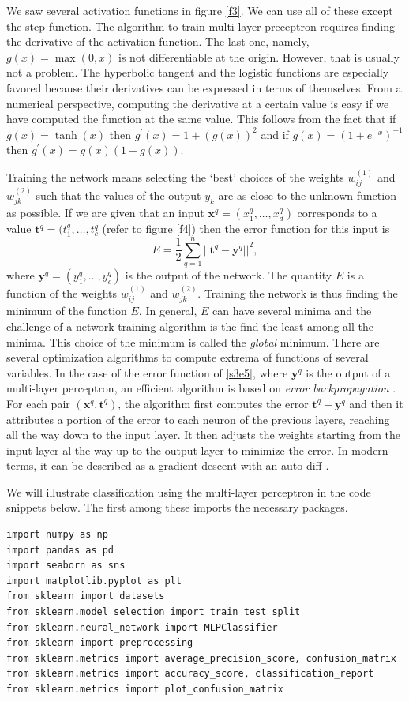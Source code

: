 \documentclass[11pt]{article}
\numberwithin{equation}{section}
\renewcommand{\vec}{\mathbf}
\begin{document}
We saw several activation functions in figure \ref{f3}. We can use all of
these except the step function. The algorithm to train multi-layer preceptron 
requires finding the 
derivative of the activation function. The last one, namely, $g(x)=\max(0, x)$ 
is not differentiable at the origin. However, that is usually not a problem. 
The hyperbolic tangent and the logistic functions are especially favored because
their derivatives can be expressed in terms of themselves. From a numerical
perspective, computing the derivative at a certain value is easy if we have
computed the function at the same value. This follows from the fact that if
$g(x) = \tanh(x)$ then $g^\prime(x) = 1 + (g(x))^2$ and if $g(x) =
(1+e^{-x})^{-1}$ then $g^\prime(x) = g(x)(1 - g(x))$.

Training the network means selecting the `best' choices of the weights 
$w^{(1)}_{ij}$ and $w^{(2)}_{jk}$ such that the values of the output $y_k$ 
are as close to the unknown function as possible. If we are given that an
input $\vec{x}^q = (x_1^q, \ldots, x_d^q)$ corresponds to a value $\vec{t}^q
= (t_1^q, \ldots, t_c^q$ (refer to figure \ref{f4}) then the error function
for this input is
\begin{equation}\label{s3e5}
E = \frac{1}{2}\sum_{q=1}^n ||\vec{t}^q - \vec{y}^q||^2,
\end{equation}
where $\vec{y}^q = (y_1^q, \ldots, y_c^q)$ is the output of the network. The
quantity $E$ is a function of the weights $w^{(1)}_{ij}$ and $w^{(2)}_{jk}$.
Training the network is thus finding the minimum of the function $E$. In 
general, $E$ can have several minima and the challenge of a network training
algorithm is the find the least among all the minima. This choice of the
minimum is called the \emph{global} minimum. There are several optimization
algorithms to compute extrema of functions of several variables. In the case
of the error function of \eqref{s3e5}, where $\vec{y}^q$ is the output of a
multi-layer perceptron, an efficient algorithm is based on \emph{error
backpropagation} \cite{rumelhart1985learning}. For each pair $(\vec{x}^q, 
\vec{t}^q)$, the algorithm first computes the error $\vec{t}^q - \vec{y}^q$
and then it attributes a portion of the error to each neuron of the previous
layers, reaching all the way down to the input layer. It then adjusts the 
weights starting from the input layer al the way up to the output layer to 
minimize the error. In modern terms, it can be described as a gradient descent 
with an auto-diff \cite{geron2019hands}.

We will illustrate classification using the multi-layer perceptron in the
code snippets below. The first among these imports the necessary packages.
\begin{verbatim}
import numpy as np
import pandas as pd
import seaborn as sns
import matplotlib.pyplot as plt
from sklearn import datasets
from sklearn.model_selection import train_test_split
from sklearn.neural_network import MLPClassifier
from sklearn import preprocessing
from sklearn.metrics import average_precision_score, confusion_matrix
from sklearn.metrics import accuracy_score, classification_report
from sklearn.metrics import plot_confusion_matrix
\end{verbatim}
\end{document}
